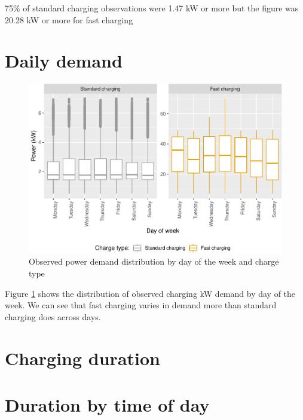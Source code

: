 \documentclass[]{article}
\begin{document}
75\% of standard charging observations were 1.47 kW or more but the
figure was 20.28 kW or more for fast charging

\section{Daily demand}\label{daily-demand}

\begin{figure}
\centering
\includegraphics{EVBB_report_files/figure-latex/dailyPower-1.pdf}
\caption{\label{fig:dailyPower}Observed power demand distribution by day of
the week and charge type}
\end{figure}

Figure \ref{fig:dailyPower} shows the distribution of observed charging
kW demand by day of the week. We can see that fast charging varies in
demand more than standard charging does across days.

\section{Charging duration}\label{duration}

\section{Duration by time of day}\label{duration-by-time-of-day}
\end{document}
